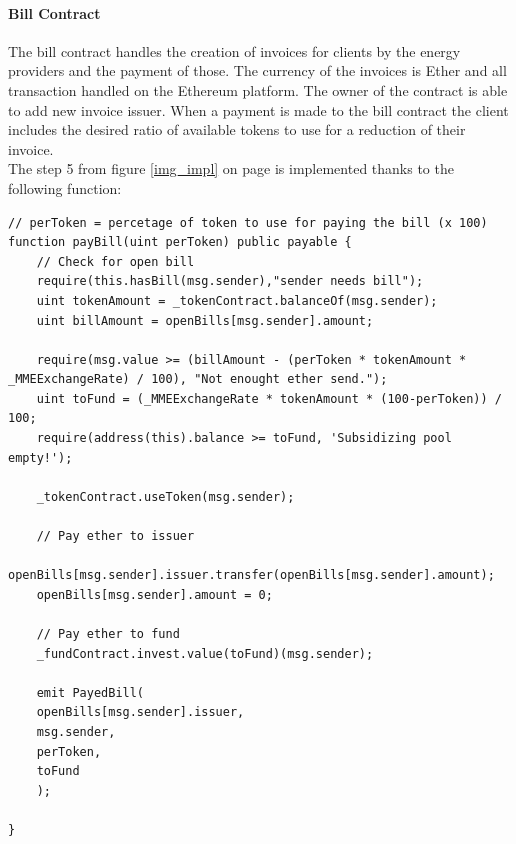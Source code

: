 \documentclass[11pt]{article}
\begin{document}
\paragraph{Bill Contract}
The bill contract handles the creation of invoices for clients by the energy providers and the payment of those. The currency of the invoices is Ether and all transaction handled on the Ethereum platform. The owner of the contract is able to add new invoice issuer. When a payment is made to the bill contract the client includes the desired ratio of available tokens to use for a reduction of their invoice.\\
The step 5 from figure \ref{img_impl} on page \pageref{img_impl} is implemented thanks to the following function:
\begin{lstlisting}[language=Solidity, firstnumber=68,caption={src/smartcontracts/contracts/Bill.sol},captionpos=b]
// perToken = percetage of token to use for paying the bill (x 100)
function payBill(uint perToken) public payable {
	// Check for open bill
	require(this.hasBill(msg.sender),"sender needs bill");
	uint tokenAmount = _tokenContract.balanceOf(msg.sender);
	uint billAmount = openBills[msg.sender].amount;

	require(msg.value >= (billAmount - (perToken * tokenAmount * _MMEExchangeRate) / 100), "Not enought ether send.");
	uint toFund = (_MMEExchangeRate * tokenAmount * (100-perToken)) / 100;
	require(address(this).balance >= toFund, 'Subsidizing pool empty!');

	_tokenContract.useToken(msg.sender);

	// Pay ether to issuer
	openBills[msg.sender].issuer.transfer(openBills[msg.sender].amount);
	openBills[msg.sender].amount = 0;

	// Pay ether to fund
	_fundContract.invest.value(toFund)(msg.sender);

	emit PayedBill(
	openBills[msg.sender].issuer,
	msg.sender,
	perToken,
	toFund
	);

}
\end{lstlisting}
\end{document}
